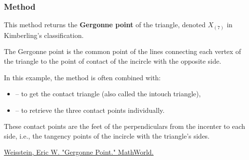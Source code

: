 \subsubsection{Method } %
\label{ssub:gergonne_point}

This method returns the \textbf{Gergonne point} of the triangle, denoted $X_{(7)}$ in Kimberling’s classification.

\medskip

The Gergonne point is the common point of the lines connecting each vertex of the triangle to the point of contact of the incircle with the opposite side.

\medskip

In this example, the method is often combined with:
\begin{itemize}
  \item {} – to get the contact triangle (also called the intouch triangle),
  \item {} – to retrieve the three contact points individually.
\end{itemize}

\medskip

These contact points are the feet of the perpendiculars from the incenter to each side, i.e., the tangency points of the incircle with the triangle’s sides.
\begin{flushright}
\small
\href{https://mathworld.wolfram.com/GergonnePoint.html}{Weisstein, Eric W. "Gergonne Point." MathWorld.}
\end{flushright}

\vspace{1em}

\begin{minipage}{.5\textwidth}
\begin{center}
\end{center}
\end{minipage}
\begin{minipage}{.5\textwidth}
\begin{tkzexample}
\end{tkzexample}
\end{minipage}

